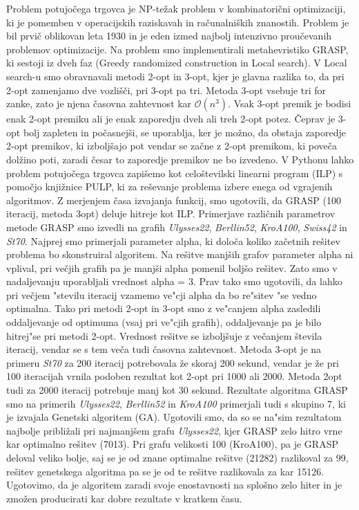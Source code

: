 \documentclass[12pt,a4paper]{amsart}
\theoremstyle{definition} %
\theoremstyle{plain} %
\begin{document}
Problem potujočega trgovca je NP-težak problem v kombinatorični optimizaciji, ki je pomemben v operacijskih raziskavah in računalniških znanostih.  Problem je bil prvič oblikovan leta 1930 in je eden izmed najbolj intenzivno proučevanih problemov optimizacije. Na problem smo implementirali metahevristiko GRASP, ki sestoji iz dveh faz (Greedy randomized construction in Local search). V Local search-u smo obravnavali metodi 2-opt in 3-opt, kjer je glavna razlika to, da pri 2-opt zamenjamo dve vozlišči, pri 3-opt pa tri. Metoda 3-opt vsebuje tri for zanke, zato je njena časovna zahtevnost kar  $\mathcal{O}(n^3)$. Vsak 3-opt premik je bodisi enak 2-opt premiku ali je enak zaporedju dveh ali treh 2-opt potez. Čeprav je 3-opt bolj zapleten in počasnejši, se uporablja, ker je možno, da obstaja zaporedje 2-opt premikov, ki izboljšajo pot vendar se začne z 2-opt premikom, ki poveča dolžino poti, zaradi česar to zaporedje premikov ne bo izvedeno.  V Pythonu lahko problem potujočega trgovca zapišemo kot celoštevilski linearni program (ILP) s pomočjo knjižnice PULP, ki za reševanje problema izbere enega od vgrajenih algoritmov. Z merjenjem časa izvajanja funkcij, smo ugotovili, da GRASP (100 iteracij, metoda 3opt) deluje hitreje kot ILP.  Primerjave različnih parametrov metode GRASP smo izvedli na grafih \textit{Ulysses22}, \textit{Berllin52}, \textit{KroA100}, \textit{Swiss42} in \textit{St70}.  Najprej smo primerjali parameter alpha, ki določa koliko začetnih rešitev problema bo skonstruiral algoritem. Na rešitve manjših grafov parameter alpha ni vplival, pri večjih grafih pa je manjši alpha pomenil boljšo rešitev. Zato smo v nadaljevanju uporabljali vrednost alpha = 3. Prav tako smo ugotovili, da lahko pri večjem "stevilu iteracij vzamemo ve"cji alpha da bo re"sitev "se vedno optimalna. Tako pri metodi 2-opt in 3-opt smo z ve"canjem alpha zasledili oddaljevanje od optimuma (vsaj pri ve"cjih grafih), oddaljevanje pa je bilo hitrej"se pri metodi 2-opt. 
Vrednost rešitve se izboljšuje z večanjem števila iteracij, vendar se s tem veča tudi časovna zahtevnost. Metoda 3-opt je na primeru \textit{St70} za 200 iteracij potrebovala že skoraj 200 sekund, vendar je že pri 100 iteracijah vrnila podoben rezultat kot 2-opt pri 1000 ali 2000. Metoda 2opt tudi za 2000 iteracij potrebuje manj kot 30 sekund. Rezultate algoritma GRASP smo na primerih \textit{Ulysses22}, \textit{Berllin52} in \textit{KroA100} primerjali tudi s skupino 7, ki je izvajala Genetski algoritem (GA). Ugotovili smo, da so se na"sim rezultatom najbolje približali pri najmanjšem grafu \textit{Ulysses22}, kjer GRASP zelo hitro vrne kar optimalno rešitev (7013). Pri grafu velikosti 100 (KroA100), pa je GRASP deloval veliko bolje, saj se je od znane optimalne rešitve (21282) razlikoval za 99, rešitev genetskega algoritma pa se je od te rešitve razlikovala za kar 15126. Ugotovimo, da je algoritem zaradi svoje enostavnosti na splošno zelo hiter in je zmožen producirati kar dobre rezultate v kratkem času. 
\end{document}

